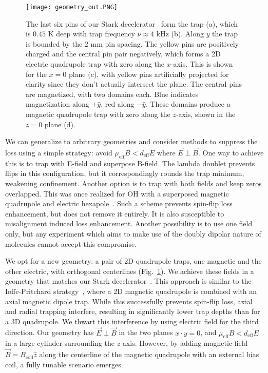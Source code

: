 \documentclass[%
 reprint,
 amsmath,amssymb,
 aps,
prl,
]{revtex4-1}
\newcommand{\epb}{{$\vec{E}\!\perp\!\vec{B}$}}
\begin{document}
\begin{figure}[tb]
\texttt{[image: geometry\_out.PNG]}%
\caption{
The last six pins of our Stark decelerator~\cite{Sawyer2008} form the trap (a), which is $0.45\text{ K}$ deep with trap frequency $\nu\approx4\text{ kHz}$ (b). 
Along $y$ the trap is bounded by the $2\text{ mm}$ pin spacing. 
The yellow pins are positively charged and the central pin pair negatively, which forms a 2D electric quadrupole trap with zero along the $x$-axis. 
This is shown for the $x=0$ plane (c), with yellow pins artificially projected for clarity since they don't actually intersect the plane. 
The central pins are magnetized, with two domains each. 
Blue indicates magnetization along $+\hat{y}$, red along $-\hat{y}$. 
These domains produce a magnetic quadrupole trap with zero along the $z$-axis, shown in the $z=0$ plane (d). 
\label{fig:CAD}}
\end{figure}

We can generalize to arbitrary geometries and consider methods to suppress the loss using a simple strategy: avoid $\mu_\text{eff}B < d_\text{eff}E$ where \epb. 
One way to achieve this is to trap with E-field and superpose B-field. 
The lambda doublet prevents flips in this configuration, but it correspondingly rounds the trap minimum, weakening confinement. 
Another option is to trap with both fields and keep zeros overlapped. 
This was once realized for OH with a superposed magnetic quadrupole and electric hexapole~\cite{Sawyer2007}. 
Such a scheme prevents spin-flip loss enhancement, but does not remove it entirely. 
It is also susceptible to misalignment induced loss enhancement. 
Another possibility is to use one field only, but any experiment which aims to make use of the doubly dipolar nature of molecules cannot accept this compromise. 

We opt for a new geometry: a pair of 2D quadrupole traps, one magnetic and the other electric, with orthogonal centerlines (Fig.~\ref{fig:CAD}). 
We achieve these fields in a geometry that matches our Stark decelerator~\cite{Bochinski2003}. 
This approach is similar to the Ioffe-Pritchard strategy~\cite{pritchard1983}, where a 2D magnetic quadrupole is combined with an axial magnetic dipole trap. 
While this successfully prevents spin-flip loss, axial and radial trapping interfere, resulting in significantly lower trap depths than for a 3D quadrupole. 
We thwart this interference by using electric field for the third direction. 
Our geometry has \epb{} in the two planes $x\cdot y=0$, and $\mu_\text{eff}B < d_\text{eff}E$ in a large cylinder surrounding the $z$-axis. 
However, by adding magnetic field $\vec{B}=B_\text{coil}\hat{z}$ along the centerline of the magnetic quadrupole with an external bias coil, a fully tunable scenario emerges. 
\end{document}
